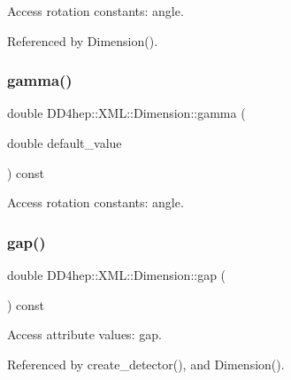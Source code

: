 Access rotation constants\+: angle. 



Referenced by Dimension().

\hypertarget{struct_d_d4hep_1_1_x_m_l_1_1_dimension_a1d5eb6ffc0d944c63d5f748d92d508d2}{}\label{struct_d_d4hep_1_1_x_m_l_1_1_dimension_a1d5eb6ffc0d944c63d5f748d92d508d2} 
\subsubsection{\texorpdfstring{gamma()}{gamma()}\hspace{0.1cm}{\footnotesize\ttfamily [2/2]}}
{\footnotesize\ttfamily double D\+D4hep\+::\+X\+M\+L\+::\+Dimension\+::gamma (\begin{DoxyParamCaption}\item[{double}]{default\+\_\+value }\end{DoxyParamCaption}) const}



Access rotation constants\+: angle. 

\hypertarget{struct_d_d4hep_1_1_x_m_l_1_1_dimension_a1b850f71f9fceb04c4df5cd9a754b96c}{}\label{struct_d_d4hep_1_1_x_m_l_1_1_dimension_a1b850f71f9fceb04c4df5cd9a754b96c} 
\subsubsection{\texorpdfstring{gap()}{gap()}}
{\footnotesize\ttfamily double D\+D4hep\+::\+X\+M\+L\+::\+Dimension\+::gap (\begin{DoxyParamCaption}{ }\end{DoxyParamCaption}) const}



Access attribute values\+: gap. 



Referenced by create\+\_\+detector(), and Dimension().

\hypertarget{struct_d_d4hep_1_1_x_m_l_1_1_dimension_a6a8f064bc14b5d83fa07e927ae6e8c4d}{}\label{struct_d_d4hep_1_1_x_m_l_1_1_dimension_a6a8f064bc14b5d83fa07e927ae6e8c4d} 
